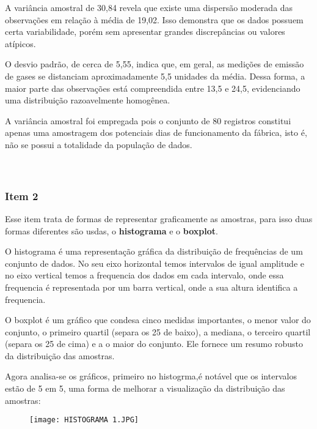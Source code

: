 \documentclass[a4paper,11pt]{article}
\begin{document}
A variância amostral de 30,84 revela que existe uma dispersão moderada das observações em relação à média de 19,02. Isso demonstra que os dados possuem certa variabilidade, porém sem apresentar grandes discrepâncias ou valores atípicos.

O desvio padrão, de cerca de 5,55, indica que, em geral, as medições de emissão de gases se distanciam aproximadamente 5,5 unidades da média. Dessa forma, a maior parte das observações está compreendida entre 13,5 e 24,5, evidenciando uma distribuição razoavelmente homogênea. 

A variância amostral foi empregada pois o conjunto de 80 registros constitui
apenas uma amostragem dos potenciais dias de funcionamento da fábrica, isto é, não se possui a totalidade da população de dados.
\\
\\
\\

\subsubsection{Item 2}

Esse item trata de formas de representar graficamente as amostras, para isso  duas formas diferentes são usdas, o \textbf{histograma} e o \textbf{boxplot}.

O histograma é uma representação gráfica da distribuição de frequências de um conjunto de dados. No seu eixo horizontal temos intervalos de igual amplitude e no eixo vertical temos a frequencia dos dados em cada intervalo, onde essa frequencia é representada por um barra vertical, onde a sua altura identifica a frequencia.

O boxplot é um gráfico que condesa cinco medidas importantes, o menor valor do conjunto, o primeiro quartil (separa os 25 de baixo), a mediana, o terceiro quartil (separa os 25 de cima) e a o maior do conjunto. Ele fornece um resumo robusto da distribuição das amostras.

Agora analisa-se os gráficos, primeiro no histogrma,é notável que os intervalos estão de 5 em 5, uma forma de melhorar a visualização da distribuição das amostras:

\begin{figure}[h]
    \centering
    \texttt{[image: HISTOGRAMA 1.JPG]}
    \caption{}
    \label{fig:placeholder}
\end{figure}
\\
\\
\end{document}
